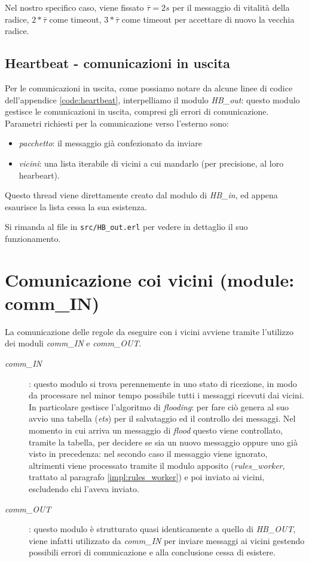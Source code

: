 \documentclass[italian]{memoir}
\begin{document}
Nel nostro specifico caso, viene fissato $\bar{\tau} = 2 s$ per il messaggio di vitalità della radice, $2*\bar{\tau}$ come timeout,  $3*\bar{\tau}$ come timeout per accettare di nuovo la vecchia radice.

\subsection{Heartbeat - comunicazioni in uscita}
Per le comunicazioni in uscita, come possiamo notare da alcune linee di codice dell'appendice \ref{code:heartbeat}, interpelliamo il modulo \textit{HB\_out}: questo modulo gestisce le comunicazioni in uscita, compresi gli errori di comunicazione. Parametri richiesti per la comunicazione verso l'esterno sono:
\begin{itemize}
\item \textit{pacchetto}: il messaggio già confezionato da inviare
\item \textit{vicini}: una lista iterabile di vicini a cui mandarlo (per precisione, al loro hearbeart).
\end{itemize}
Questo thread viene direttamente creato dal modulo di \textit{HB\_in}, ed appena esaurisce la lista cessa la sua esistenza.

Si rimanda al file in \texttt{src/HB\_out.erl} per vedere in dettaglio il suo funzionamento.

\section{Comunicazione coi vicini (module: comm\_IN)}

La comunicazione delle regole da eseguire con i vicini avviene tramite l'utilizzo dei moduli \textit{comm\_IN} e \textit{comm\_OUT}.
\begin{description}
\item[\textit{comm\_IN}]: questo modulo si trova perennemente in uno stato di ricezione, in modo da processare nel minor tempo possibile tutti i messaggi ricevuti dai vicini. In particolare  gestisce l'algoritmo di \textit{flooding}: per fare ciò genera al suo avvio una tabella (\textit{ets}) per il salvataggio ed il controllo dei messaggi. Nel momento in cui arriva un messaggio di \textit{flood} questo viene controllato, tramite la tabella, per decidere se sia un nuovo messaggio oppure uno già visto in precedenza: nel secondo caso il messaggio viene ignorato, altrimenti viene processato tramite il modulo apposito (\textit{rules\_worker}, trattato al paragrafo \ref{impl:rules_worker}) e poi inviato ai vicini, escludendo chi l'aveva inviato. %
\item[\textit{comm\_OUT}]: questo modulo è strutturato quasi identicamente a quello di \textit{HB\_OUT}, viene infatti utilizzato da \textit{comm\_IN} per inviare messaggi ai vicini gestendo possibili errori di comunicazione e alla conclusione cessa di esistere.
\end{description}
\end{document}
